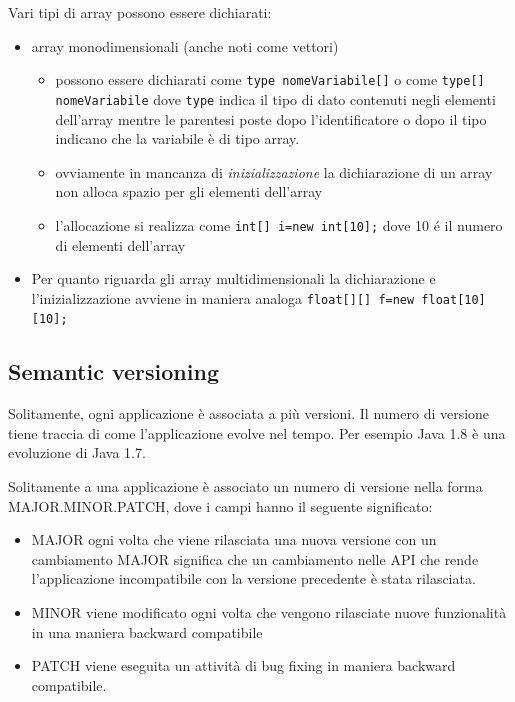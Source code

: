 \documentclass{article}
\theoremstyle{definition}
\begin{document}
Vari tipi di array possono essere dichiarati:
\begin{itemize}
\item array monodimensionali (anche noti come vettori)
\begin{itemize}
\item possono essere dichiarati come \texttt{type nomeVariabile[]} o come \texttt{type[] nomeVariabile} dove \texttt{type} indica il tipo di dato contenuti negli elementi dell'array mentre le parentesi poste dopo l'identificatore o dopo il tipo indicano che la variabile \`e di tipo array.
\item ovviamente in mancanza di \emph{inizializzazione} la dichiarazione di un array non alloca spazio per gli elementi dell'array
\item l'allocazione si realizza come \texttt{int[] i=new int[10];} dove 10 \'e il numero di elementi dell'array
\end{itemize}
\item Per quanto riguarda gli array multidimensionali la dichiarazione e l'inizializzazione avviene in maniera analoga \texttt{float[][] f=new float[10][10];}
\end{itemize}

\subsection{Semantic versioning}
Solitamente, ogni applicazione \`e associata a pi\`u versioni. Il numero di versione tiene traccia di come l'applicazione evolve nel tempo.
Per esempio Java 1.8 \`e una evoluzione di Java 1.7.

Solitamente a una applicazione \`e associato un numero di versione nella forma MAJOR.MINOR.PATCH, dove i campi hanno il seguente significato:
\begin{itemize}
\item MAJOR ogni volta che viene rilasciata una nuova versione con un cambiamento MAJOR significa che un cambiamento nelle API che rende l'applicazione incompatibile con la versione precedente \`e stata rilasciata. 
\item MINOR viene modificato ogni volta che vengono rilasciate nuove funzionalit\`a in una maniera backward compatibile
\item PATCH viene eseguita un attivit\`a di bug fixing in maniera backward compatibile.
\end{itemize}
\end{document}
